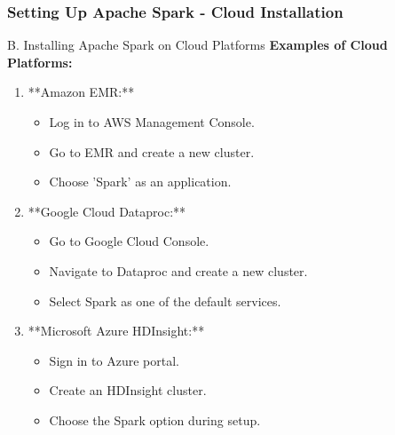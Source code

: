 \documentclass[aspectratio=169]{beamer}
\begin{document}
\begin{frame}[fragile]
    \frametitle{Setting Up Apache Spark - Cloud Installation}
    \begin{block}{B. Installing Apache Spark on Cloud Platforms}
        \textbf{Examples of Cloud Platforms:}
        \begin{enumerate}
            \item **Amazon EMR:**
                \begin{itemize}
                    \item Log in to AWS Management Console.
                    \item Go to EMR and create a new cluster.
                    \item Choose 'Spark' as an application.
                \end{itemize}
            \item **Google Cloud Dataproc:**
                \begin{itemize}
                    \item Go to Google Cloud Console.
                    \item Navigate to Dataproc and create a new cluster.
                    \item Select Spark as one of the default services.
                \end{itemize}
            \item **Microsoft Azure HDInsight:**
                \begin{itemize}
                    \item Sign in to Azure portal.
                    \item Create an HDInsight cluster.
                    \item Choose the Spark option during setup.
                \end{itemize}
        \end{enumerate}
    \end{block}
\end{frame}
\end{document}
